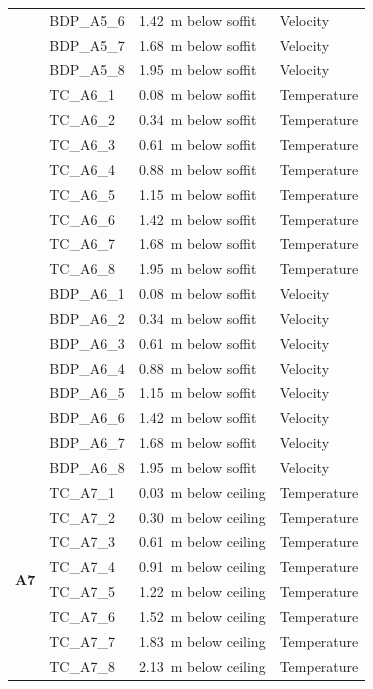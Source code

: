 \documentclass[12pt,oneside]{book}
\begin{document}
\begin{longtable}[c]{c|lll}
 & BDP\_A5\_6 & 1.42~m below soffit  & Velocity \\
 & BDP\_A5\_7 & 1.68~m below soffit  & Velocity \\
 & BDP\_A5\_8 & 1.95~m below soffit  & Velocity \\
\bottomrule
\newpage
\multirow{16}{*}{\large{\textbf{A6}}}
 & TC\_A6\_1  & 0.08~m below soffit  & Temperature \\
 & TC\_A6\_2  & 0.34~m below soffit  & Temperature \\
 & TC\_A6\_3  & 0.61~m below soffit  & Temperature \\
 & TC\_A6\_4  & 0.88~m below soffit  & Temperature \\
 & TC\_A6\_5  & 1.15~m below soffit  & Temperature \\
 & TC\_A6\_6  & 1.42~m below soffit  & Temperature \\
 & TC\_A6\_7  & 1.68~m below soffit  & Temperature \\
 & TC\_A6\_8  & 1.95~m below soffit  & Temperature \\
\cline{2-4}
 & BDP\_A6\_1 & 0.08~m below soffit  & Velocity \\
 & BDP\_A6\_2 & 0.34~m below soffit  & Velocity \\
 & BDP\_A6\_3 & 0.61~m below soffit  & Velocity \\
 & BDP\_A6\_4 & 0.88~m below soffit  & Velocity \\
 & BDP\_A6\_5 & 1.15~m below soffit  & Velocity \\
 & BDP\_A6\_6 & 1.42~m below soffit  & Velocity \\
 & BDP\_A6\_7 & 1.68~m below soffit  & Velocity \\
 & BDP\_A6\_8 & 1.95~m below soffit  & Velocity \\
\midrule
\multirow{8}{*}{\large{\textbf{A7}}}
 & TC\_A7\_1  & 0.03~m below ceiling & Temperature \\
 & TC\_A7\_2  & 0.30~m below ceiling & Temperature \\
 & TC\_A7\_3  & 0.61~m below ceiling & Temperature \\
 & TC\_A7\_4  & 0.91~m below ceiling & Temperature \\
 & TC\_A7\_5  & 1.22~m below ceiling & Temperature \\
 & TC\_A7\_6  & 1.52~m below ceiling & Temperature \\
 & TC\_A7\_7  & 1.83~m below ceiling & Temperature \\
 & TC\_A7\_8  & 2.13~m below ceiling & Temperature \\

\end{longtable}
\end{document}
